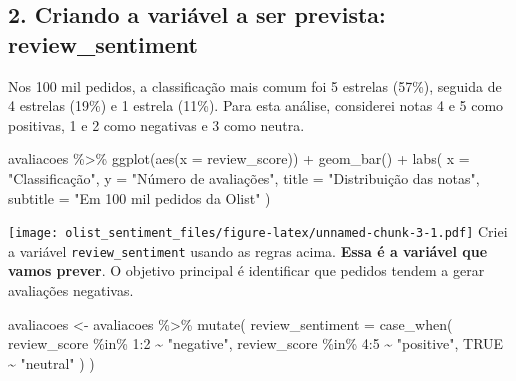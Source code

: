 \documentclass[
]{article}
\newenvironment{Shaded}{\begin{snugshade}}{\end{snugshade}}
\newcommand{\AttributeTok}[1]{\textcolor[rgb]{0.77,0.63,0.00}{#1}}
\newcommand{\ConstantTok}[1]{\textcolor[rgb]{0.00,0.00,0.00}{#1}}
\newcommand{\DecValTok}[1]{\textcolor[rgb]{0.00,0.00,0.81}{#1}}
\newcommand{\FunctionTok}[1]{\textcolor[rgb]{0.00,0.00,0.00}{#1}}
\newcommand{\NormalTok}[1]{#1}
\newcommand{\OtherTok}[1]{\textcolor[rgb]{0.56,0.35,0.01}{#1}}
\newcommand{\SpecialCharTok}[1]{\textcolor[rgb]{0.00,0.00,0.00}{#1}}
\newcommand{\StringTok}[1]{\textcolor[rgb]{0.31,0.60,0.02}{#1}}
\begin{document}
\hypertarget{criando-a-variuxe1vel-a-ser-prevista-review_sentiment}{%
\subsection{2. Criando a variável a ser prevista:
review\_sentiment}\label{criando-a-variuxe1vel-a-ser-prevista-review_sentiment}}

Nos 100 mil pedidos, a classificação mais comum foi 5 estrelas (57\%),
seguida de 4 estrelas (19\%) e 1 estrela (11\%). Para esta análise,
considerei notas 4 e 5 como positivas, 1 e 2 como negativas e 3 como
neutra.

\begin{Shaded}
\begin{Highlighting}[]
\NormalTok{avaliacoes }\SpecialCharTok{\%\textgreater{}\%}
  \FunctionTok{ggplot}\NormalTok{(}\FunctionTok{aes}\NormalTok{(}\AttributeTok{x =}\NormalTok{ review\_score)) }\SpecialCharTok{+}
  \FunctionTok{geom\_bar}\NormalTok{() }\SpecialCharTok{+}
  \FunctionTok{labs}\NormalTok{(}
    \AttributeTok{x =} \StringTok{"Classificação"}\NormalTok{,}
    \AttributeTok{y =} \StringTok{"Número de avaliações"}\NormalTok{,}
    \AttributeTok{title =} \StringTok{"Distribuição das notas"}\NormalTok{,}
    \AttributeTok{subtitle =} \StringTok{"Em 100 mil pedidos da Olist"}
\NormalTok{  )}
\end{Highlighting}
\end{Shaded}

\texttt{[image: olist\_sentiment\_files/figure-latex/unnamed-chunk-3-1.pdf]}
Criei a variável \texttt{review\_sentiment} usando as regras acima.
\textbf{Essa é a variável que vamos prever}. O objetivo principal é
identificar que pedidos tendem a gerar avaliações negativas.

\begin{Shaded}
\begin{Highlighting}[]
\NormalTok{avaliacoes }\OtherTok{\textless{}{-}}\NormalTok{ avaliacoes }\SpecialCharTok{\%\textgreater{}\%}
  \FunctionTok{mutate}\NormalTok{(}
    \AttributeTok{review\_sentiment =} \FunctionTok{case\_when}\NormalTok{(}
\NormalTok{      review\_score }\SpecialCharTok{\%in\%} \DecValTok{1}\SpecialCharTok{:}\DecValTok{2} \SpecialCharTok{\textasciitilde{}} \StringTok{"negative"}\NormalTok{,}
\NormalTok{      review\_score }\SpecialCharTok{\%in\%} \DecValTok{4}\SpecialCharTok{:}\DecValTok{5} \SpecialCharTok{\textasciitilde{}} \StringTok{"positive"}\NormalTok{,}
      \ConstantTok{TRUE} \SpecialCharTok{\textasciitilde{}} \StringTok{"neutral"}
\NormalTok{    )}
\NormalTok{  )}
\end{Highlighting}
\end{Shaded}
\end{document}
